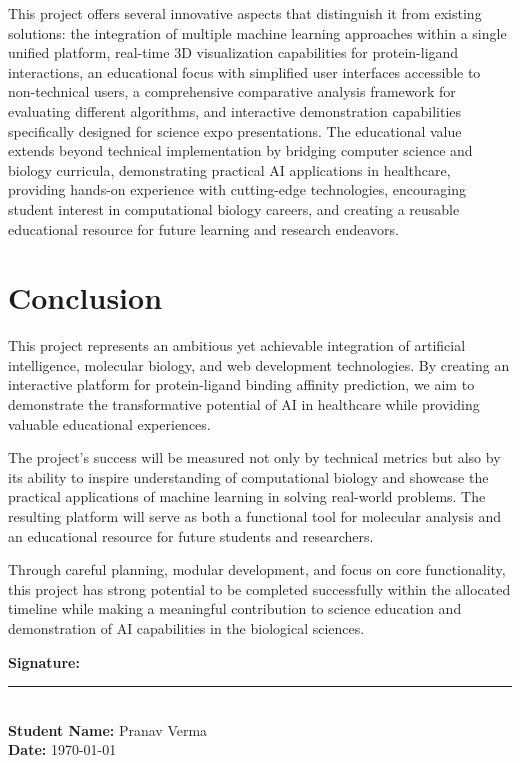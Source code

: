 \documentclass[12pt,a4paper]{article}
\begin{document}
This project offers several innovative aspects that distinguish it from existing solutions: the integration of multiple machine learning approaches within a single unified platform, real-time 3D visualization capabilities for protein-ligand interactions, an educational focus with simplified user interfaces accessible to non-technical users, a comprehensive comparative analysis framework for evaluating different algorithms, and interactive demonstration capabilities specifically designed for science expo presentations. The educational value extends beyond technical implementation by bridging computer science and biology curricula, demonstrating practical AI applications in healthcare, providing hands-on experience with cutting-edge technologies, encouraging student interest in computational biology careers, and creating a reusable educational resource for future learning and research endeavors.

\section{Conclusion}

This project represents an ambitious yet achievable integration of artificial intelligence, molecular biology, and web development technologies. By creating an interactive platform for protein-ligand binding affinity prediction, we aim to demonstrate the transformative potential of AI in healthcare while providing valuable educational experiences.

The project's success will be measured not only by technical metrics but also by its ability to inspire understanding of computational biology and showcase the practical applications of machine learning in solving real-world problems. The resulting platform will serve as both a functional tool for molecular analysis and an educational resource for future students and researchers.

Through careful planning, modular development, and focus on core functionality, this project has strong potential to be completed successfully within the allocated timeline while making a meaningful contribution to science education and demonstration of AI capabilities in the biological sciences.

\vspace{1cm}

\noindent\textbf{Signature:} \rule{5cm}{0.4pt}\\
\textbf{Student Name:} Pranav Verma\\
\textbf{Date:} \today
\end{document}

